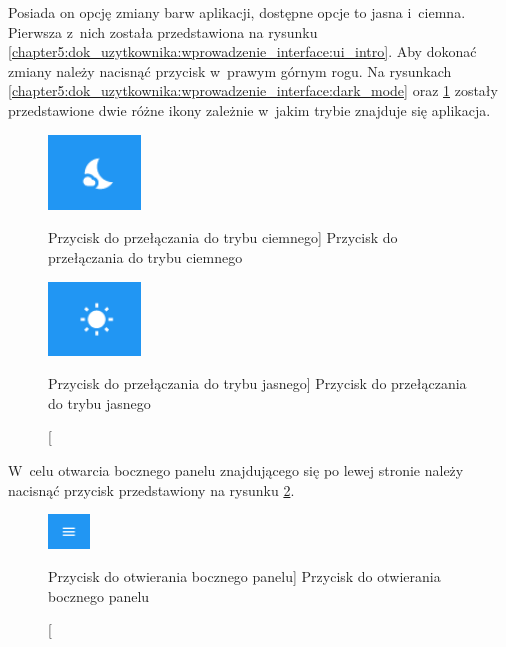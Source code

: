 \documentclass[../Kamil_Kowalewski_Main.tex]{subfiles}
\begin{document}
{{        Posiada on opcję zmiany barw aplikacji, dostępne opcje to jasna i~ciemna.
        Pierwsza z~nich została przedstawiona na rysunku
        \ref{chapter5:dok_uzytkownika:wprowadzenie_interface:ui_intro}. Aby dokonać
        zmiany należy nacisnąć przycisk w~prawym górnym rogu. Na rysunkach
        \ref{chapter5:dok_uzytkownika:wprowadzenie_interface:dark_mode} oraz
        \ref{chapter5:dok_uzytkownika:wprowadzenie_interface:light_mode}
        zostały przedstawione dwie różne ikony zależnie w~jakim trybie znajduje
        się aplikacja.
        \begin{figure}[H]
            \centering
            \begin{minipage}[b]{0.45\textwidth}
                \centering
                \includegraphics[width=0.22\textwidth, keepaspectratio]
                {img/chapter5/intro/to_dark_mode.png}
                \caption
                [Przycisk do przełączania do trybu ciemnego]
                {Przycisk do przełączania do trybu ciemnego}
                \label{chapter5:dok_uzytkownika:wprowadzenie_interface:dark_mode}
            \end{minipage}
            \hfill
            \begin{minipage}[b]{0.45\textwidth}
                \centering
                \includegraphics[width=0.22\textwidth, keepaspectratio]
                {img/chapter5/intro/to_light_mode.png}
                \caption
                [Przycisk do przełączania do trybu jasnego]
                {Przycisk do przełączania do trybu jasnego}
                \label{chapter5:dok_uzytkownika:wprowadzenie_interface:light_mode}
            \end{minipage}
        \end{figure}

        W~celu otwarcia bocznego panelu znajdującego się po lewej stronie należy nacisnąć
        przycisk przedstawiony na rysunku
        \ref{chapter5:dok_uzytkownika:wprowadzenie_interface:sidebar_open_button}.
        \begin{figure}[H]
            \centering
            \includegraphics[width=0.1\textwidth, keepaspectratio]
            {img/chapter5/intro/open_sidebar.png}
            \caption
            [Przycisk do otwierania bocznego panelu]
            {Przycisk do otwierania bocznego panelu}
            \label{chapter5:dok_uzytkownika:wprowadzenie_interface:sidebar_open_button}
        \end{figure}

}}
\end{document}
